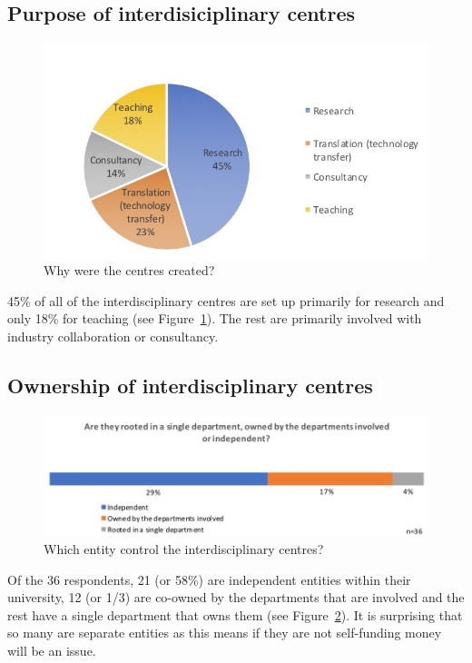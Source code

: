 \subsection{Purpose of interdisiciplinary centres}

\begin{figure}[h]
\centering
\includegraphics[width = \linewidth]{charts/5b.jpg}
\caption{Why were the centres created?}
\label{sect5:reasons}
\end{figure}

45\% of all of the interdisciplinary centres are set up primarily for research and only 18\% for teaching (see Figure~\ref{sect5:reasons}). The rest are primarily involved with industry collaboration or consultancy.

\subsection{ Ownership of interdisciplinary centres}

\begin{figure}[h]
\centering
\includegraphics[width = \linewidth]{charts/5c.jpg}
\caption{Which entity control the interdisciplinary centres?}
\label{sect5:owners}
\end{figure}

Of the 36 respondents, 21 (or 58\%) are independent entities within their university, 12 (or 1/3) are co-owned by the departments that are involved and the rest have a single department that owns them (see Figure~\ref{sect5:owners}). It is surprising that so many are separate entities as this means if they are not self-funding money will be an issue.

